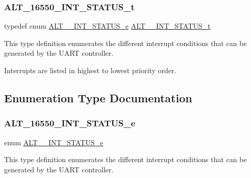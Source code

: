 \subsubsection{\texorpdfstring{ALT\_16550\_INT\_STATUS\_t}{ALT\_16550\_INT\_STATUS\_t}}
{\footnotesize\ttfamily typedef enum \mbox{\hyperlink{group__UART__INT_ga108129e1efabc17da3950f0b654c62d0}{A\+L\+T\+\_\+\_\+\+I\+N\+T\+\_\+\+S\+T\+A\+T\+U\+S\+\_\+e}}
 \mbox{\hyperlink{group__UART__INT_ga3112f458546736bbc043e8b00662855e}{A\+L\+T\+\_\+\_\+\+I\+N\+T\+\_\+\+S\+T\+A\+T\+U\+S\+\_\+t}}}

This type definition enumerates the different interrupt conditions that can be generated by the U\+A\+RT controller.

Interrupts are listed in highest to lowest priority order. 

\subsection{Enumeration Type Documentation}
\mbox{\label{group__UART__INT_ga108129e1efabc17da3950f0b654c62d0}} 
\subsubsection{\texorpdfstring{ALT\_16550\_INT\_STATUS\_e}{ALT\_16550\_INT\_STATUS\_e}}
{\footnotesize\ttfamily enum \mbox{\hyperlink{group__UART__INT_ga108129e1efabc17da3950f0b654c62d0}{A\+L\+T\+\_\+\_\+\+I\+N\+T\+\_\+\+S\+T\+A\+T\+U\+S\+\_\+e}}}

This type definition enumerates the different interrupt conditions that can be generated by the U\+A\+RT controller.

